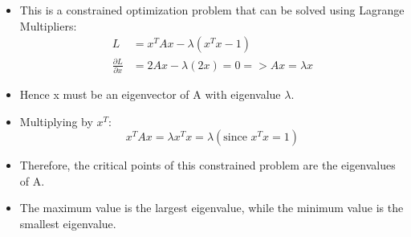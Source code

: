 \begin{frame}
\begin{itemize}
  \item<1-> This is a constrained optimization problem that can be solved using Lagrange Multipliers:
  \begin{align*}
    L &= x^T A x - \lambda (x^T x - 1)\\
    \frac{\partial L}{\partial x} &= 2Ax -\lambda(2x) = 0 => Ax = \lambda x
  \end{align*}
  \item<2-> Hence x must be an eigenvector of A with eigenvalue $\lambda$.
  \item<3-> Multiplying by $x^T$:
  $$x^T A x = \lambda x^T x = \lambda (\text{since }x^T x = 1)$$
  \item<4-> Therefore, the critical points of this constrained problem are the eigenvalues of A.
  \item<5-> The maximum value is the largest eigenvalue, while the minimum value is the smallest eigenvalue.
\end{itemize}

\end{frame}
\begin{frame}
\end{frame}
